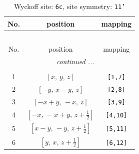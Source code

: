\documentclass[fleqn,8pt]{jsarticle}
\begin{document}
\renewcommand{\arraystretch}{1.2}
\begin{longtable}{ccc}
\caption{Wyckoff site: {\tt 6c}, site symmetry: {\tt 11'}}
 \\
 \hline \hline
No. & position & mapping \\ \hline \endfirsthead

\multicolumn{2}{l}{\tablename\ \thetable{}} \\
 \hline \hline
No. & position & mapping \\ \hline \endhead

 \hline \hline
\multicolumn{2}{r}{\footnotesize\it continued ...} \\ \endfoot

 \hline \hline
\multicolumn{2}{r}{} \\ \endlastfoot

1 & $\left[ x,\, y,\, z \right]$ & {\tt [1,7]} \\ \hline
2 & $\left[ - y,\, x - y,\, z \right]$ & {\tt [2,8]} \\ \hline
3 & $\left[ - x + y,\, - x,\, z \right]$ & {\tt [3,9]} \\ \hline
4 & $\left[ - x,\, - x + y,\, z + \frac{1}{2} \right]$ & {\tt [4,10]} \\ \hline
5 & $\left[ x - y,\, - y,\, z + \frac{1}{2} \right]$ & {\tt [5,11]} \\ \hline
6 & $\left[ y,\, x,\, z + \frac{1}{2} \right]$ & {\tt [6,12]} \\
\end{longtable}
\end{document}
